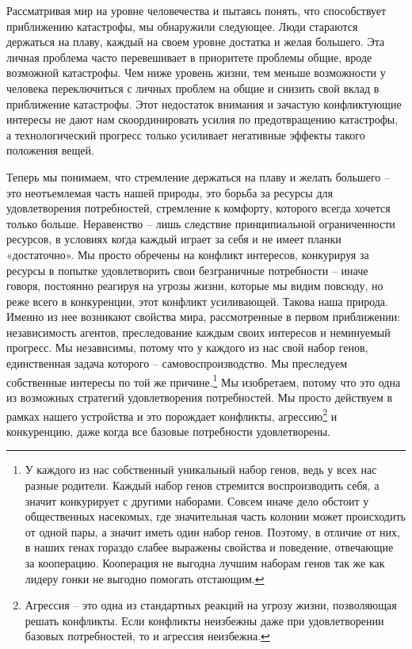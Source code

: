 \documentclass[12pt,a4paper]{report}
\begin{document}
\noindent Рассматривая мир на уровне человечества и пытаясь понять, что способствует приближению катастрофы, мы обнаружили следующее. Люди стараются держаться на плаву, каждый на своем уровне достатка и желая большего. Эта личная проблема часто перевешивает в приоритете проблемы общие, вроде возможной катастрофы. Чем ниже уровень жизни, тем меньше возможности у человека переключиться с личных проблем на общие и снизить свой вклад в приближение катастрофы. Этот недостаток внимания и зачастую конфликтующие интересы не дают нам скоординировать усилия по предотвращению катастрофы, а технологический прогресс только усиливает негативные эффекты такого положения вещей.

\noindent Теперь мы понимаем, что стремление держаться на плаву и желать большего -- это неотъемлемая часть нашей природы, это борьба за ресурсы для удовлетворения потребностей, стремление к комфорту, которого всегда хочется только больше. Неравенство -- лишь следствие принципиальной ограниченности ресурсов, в условиях когда каждый играет за себя и не имеет планки «достаточно». Мы просто обречены на конфликт интересов, конкурируя за ресурсы в попытке удовлетворить свои безграничные потребности -- иначе говоря, постоянно реагируя на угрозы жизни, которые мы видим повсюду, но реже всего в конкуренции, этот конфликт усиливающей. Такова наша природа. Именно из нее возникают свойства мира, рассмотренные в первом приближении: независимость агентов, преследование каждым своих интересов и неминуемый прогресс. Мы независимы, потому что у каждого из нас свой набор генов, единственная задача которого -- самовоспроизводство. Мы преследуем собственные интересы по той же причине.\footnote{У каждого из нас собственный уникальный набор генов, ведь у всех нас разные родители. Каждый набор генов стремится воспроизводить себя, а значит конкурирует с другими наборами. Совсем иначе дело обстоит у общественных насекомых, где значительная часть колонии может происходить от одной пары, а значит иметь один набор генов. Поэтому, в отличие от них, в наших генах гораздо слабее выражены свойства и поведение, отвечающие за кооперацию. Кооперация не выгодна лучшим наборам генов так же как лидеру гонки не выгодно помогать отстающим.} Мы изобретаем, потому что это одна из возможных стратегий удовлетворения потребностей. Мы просто действуем в рамках нашего устройства и это порождает конфликты, агрессию\footnote{Агрессия -- это одна из стандартных реакций на угрозу жизни, позволяющая решать конфликты. Если конфликты неизбежны даже при удовлетворении базовых потребностей, то и агрессия неизбежна.} и конкуренцию, даже когда все базовые потребности удовлетворены.
\end{document}
